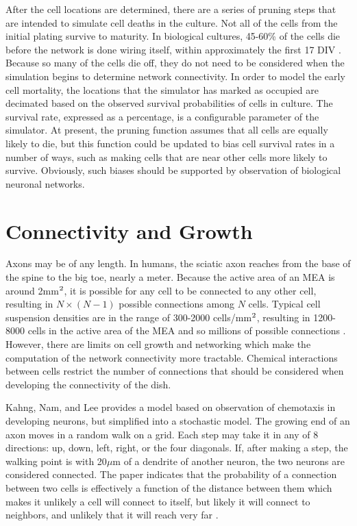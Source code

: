 \documentclass[letterpaper]{article}
\newcommand{\superscript}[1]{\ensuremath{^{\textrm{\scriptsize{#1}}}}}
\begin{document}
After the cell locations are determined, there are a series of pruning steps that are intended to simulate cell deaths in the culture. 
Not all of the cells from the initial plating survive to maturity. 
In biological cultures, 45-60\% of the cells die before the network is done wiring itself, within approximately the first 17 DIV \cite{erickson2008caged}.
Because so many of the cells die off, they do not need to be considered when the simulation begins to determine network connectivity. 
In order to model the early cell mortality, the locations that the simulator has marked as occupied are decimated based on the observed survival probabilities of cells in culture. 
The survival rate, expressed as a percentage, is a configurable parameter of the simulator. 
At present, the pruning function assumes that all cells are equally likely to die, but this function could be updated to bias cell survival rates in a number of ways, such as making cells that are near other cells more likely to survive. 
Obviously, such biases should be supported by observation of biological neuronal networks. 

\section{Connectivity and Growth}

Axons may be of any length. 
In humans, the sciatic axon reaches from the base of the spine to the big toe, nearly a meter. 
Because the active area of an MEA is around 2mm\superscript{2}, it is possible for any cell to be connected to any other cell, resulting in $N\times(N-1)$ possible connections among $N$ cells. 
Typical cell suspension densities are in the range of 300-2000 cells/mm\superscript{2}, resulting in 1200-8000 cells in the active area of the MEA and so millions of possible connections \cite{wagenaar2006extremely}.
However, there are limits on cell growth and networking which make the computation of the network connectivity more tractable. 
Chemical interactions between cells restrict the number of connections that should be considered when developing the connectivity of the dish. 

Kahng, Nam, and Lee \citeyear{kahng2007stochastic} provides a model based on observation of chemotaxis in developing neurons, but simplified into a stochastic model. 
The growing end of an axon moves in a random walk on a grid. 
Each step may take it in any of 8 directions: up, down, left, right, or the four diagonals.
If, after making a step, the walking point is with 20$\mu$m of a dendrite of another neuron, the two neurons are considered connected. 
The paper indicates that the probability of a connection between two cells is effectively a function of the distance between them which makes it unlikely a cell will connect to itself, but likely it will connect to neighbors, and unlikely that it will reach very far \cite{Segev2000185}. 
\end{document}
